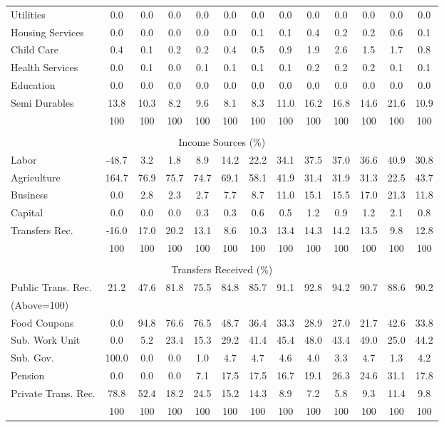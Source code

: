 \begin{tabular}{l c c c| c c c c c| c c c| c}
Utilities    & 0.0 & 0.0 & 0.0 & 0.0 & 0.0 & 0.0 & 0.0 & 0.0 & 0.0 & 0.0 & 0.0 & 0.0 \\
Housing Services  & 0.0 & 0.0 & 0.0 & 0.0 & 0.0 & 0.1 & 0.1 & 0.4 & 0.2 & 0.2 & 0.6 & 0.1 \\
Child Care   & 0.4 & 0.1 & 0.2 & 0.2 & 0.4 & 0.5 & 0.9 & 1.9 & 2.6 & 1.5 & 1.7 & 0.8 \\
Health Services    & 0.0 & 0.1 & 0.0 & 0.1 & 0.1 & 0.1 & 0.1 & 0.2 & 0.2 & 0.2 & 0.1 & 0.1 \\
Education   & 0.0 & 0.0 & 0.0 & 0.0 & 0.0 & 0.0 & 0.0 & 0.0 & 0.0 & 0.0 & 0.0 & 0.0 \\
Semi Durables     & 13.8 & 10.3 & 8.2 & 9.6 & 8.1 & 8.3 & 11.0 & 16.2 & 16.8 & 14.6 & 21.6 & 10.9 \\
\midrule
 & 100 & 100 & 100 & 100 & 100 & 100 & 100 & 100 & 100 & 100 & 100 & 100 \\
\midrule \\
\multicolumn{13}{c}{Income Sources (\%)}  \\
\midrule
Labor        & -48.7 & 3.2 & 1.8 & 8.9 & 14.2 & 22.2 & 34.1 & 37.5 & 37.0 & 36.6 & 40.9 & 30.8 \\
Agriculture  & 164.7 & 76.9 & 75.7 & 74.7 & 69.1 & 58.1 & 41.9 & 31.4 & 31.9 & 31.3 & 22.5 & 43.7 \\
Business     & 0.0 & 2.8 & 2.3 & 2.7 & 7.7 & 8.7 & 11.0 & 15.1 & 15.5 & 17.0 & 21.3 & 11.8 \\
Capital      & 0.0 & 0.0 & 0.0 & 0.3 & 0.3 & 0.6 & 0.5 & 1.2 & 0.9 & 1.2 & 2.1 & 0.8 \\
Transfers Rec.  & -16.0 & 17.0 & 20.2 & 13.1 & 8.6 & 10.3 & 13.4 & 14.3 & 14.2 & 13.5 & 9.8 & 12.8 \\
\midrule
 & 100 & 100 & 100 & 100 & 100 & 100 & 100 & 100 & 100 & 100 & 100 & 100 \\
\midrule \\
\multicolumn{13}{c}{Transfers Received (\%)}  \\
\midrule
Public Trans. Rec.  & 21.2 & 47.6 & 81.8 & 75.5 & 84.8 & 85.7 & 91.1 & 92.8 & 94.2 & 90.7 & 88.6 & 90.2 \\
(Above=100) & & & & & & & & & & & &  \\
\hspace{.3cm} Food Coupons    & 0.0 & 94.8 & 76.6 & 76.5 & 48.7 & 36.4 & 33.3 & 28.9 & 27.0 & 21.7 & 42.6 & 33.8 \\
\hspace{.3cm} Sub. Work Unit  & 0.0 & 5.2 & 23.4 & 15.3 & 29.2 & 41.4 & 45.4 & 48.0 & 43.4 & 49.0 & 25.0 & 44.2 \\
\hspace{.3cm} Sub. Gov.       & 100.0 & 0.0 & 0.0 & 1.0 & 4.7 & 4.7 & 4.6 & 4.0 & 3.3 & 4.7 & 1.3 & 4.2 \\
\hspace{.3cm} Pension         & 0.0 & 0.0 & 0.0 & 7.1 & 17.5 & 17.5 & 16.7 & 19.1 & 26.3 & 24.6 & 31.1 & 17.8 \\
Private Trans. Rec. & 78.8 & 52.4 & 18.2 & 24.5 & 15.2 & 14.3 & 8.9 & 7.2 & 5.8 & 9.3 & 11.4 & 9.8 \\
\midrule
 & 100 & 100 & 100 & 100 & 100 & 100 & 100 & 100 & 100 & 100 & 100 & 100 \\
\bottomrule
\end{tabular}